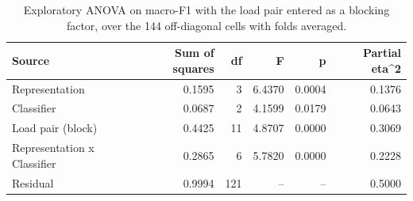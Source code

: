 \begin{table}[htbp]
\centering
\caption{Exploratory ANOVA on macro-F1 with the load pair entered as a blocking factor, over the 144 off-diagonal cells with folds averaged.}
\label{tab:anovabloque}
\begin{tabular}{lrrrrr}
\toprule
Source & Sum of squares & df & F & p & Partial eta\textasciicircum{}2 \\
\midrule
Representation & 0.1595 & 3 & 6.4370 & 0.0004 & 0.1376 \\
Classifier & 0.0687 & 2 & 4.1599 & 0.0179 & 0.0643 \\
Load pair (block) & 0.4425 & 11 & 4.8707 & 0.0000 & 0.3069 \\
Representation x Classifier & 0.2865 & 6 & 5.7820 & 0.0000 & 0.2228 \\
Residual & 0.9994 & 121 & -- & -- & 0.5000 \\
\bottomrule
\end{tabular}
\end{table}
